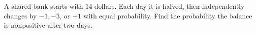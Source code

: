 A shared bank starts with 14 dollars. Each day it is halved, then independently changes by $-1,-3$, or $+1$ with equal probability. Find the probability the balance is nonpositive after two days.
